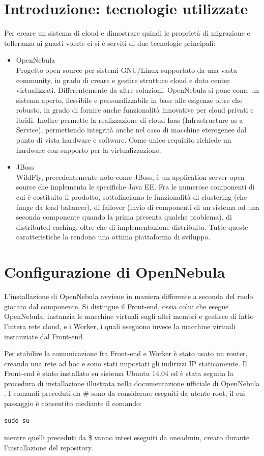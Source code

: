 \documentclass[twoside]{article}
\begin{document}
\section{Introduzione: tecnologie utilizzate}
Per creare un sistema di cloud e dimostrare quindi le proprietà di migrazione e
tolleranza ai guasti volute ci si è serviti di due tecnologie principali:
\begin{itemize}
	\item OpenNebula \\
		  Progetto open source per sistemi GNU/Linux supportato da una vasta community, in grado di
		  creare e gestire strutture cloud e data center virtualizzati. Differentemente da altre soluzioni,
		  OpenNebula si pone come un sistema aperto, flessibile e personalizzabile in base alle esigenze
		  oltre che robusto, in grado di fornire anche funzionalità innovative per cloud privati e ibridi.
		  Inoltre permette la realizzazione di cloud Iaas (Infrastructure as a Service), permettendo integrità
		  anche nel caso di macchine eterogenee dal punto di vista hardware e software. Come unico requisito
		  richiede un hardware con supporto per la virtualizzazione.
	\item JBoss \\
		  WildFly, precedentemente noto come JBoss, è un application server open source che implementa
		  le specifiche Java EE. Fra le numerose componenti di cui è costituito il prodotto, sottolineiamo
		  le funzionalità di clustering (che funge da load balancer), di failover (invio di componenti di
		  un sistema ad una seconda componente quando la prima presenta qualche problema), di distributed
		  caching, oltre che di implementazione distribuita. Tutte queste caratteristiche la rendono una
		  ottima piattaforma di sviluppo.
\end{itemize}

\section{Configurazione di OpenNebula}
L'installazione di OpenNebula avviene in maniera differente a seconda del ruolo giocato dal componente.
Si distingue il Front-end, ossia colui che esegue OpenNebula, instanzia le macchine virtuali sugli altri
membri e gestisce di fatto l'intera rete cloud, e i Worker, i quali eseguono invece la macchine virtuali
instanziate dal Front-end.

Per stabilire la comunicazione fra Front-end e Worker è stato usato un router, creando una rete ad hoc 
e sono stati impostati gli indirizzi IP staticamente.
Il Front-end è stato installato su sistema Ubuntu 14.04 ed è stata seguita
la procedura di installazione illustrata nella documentazione ufficiale di OpenNebula \cite{bib:opennebula}.
I comandi preceduti da \# sono da considerare eseguiti da utente root, il cui passaggio è consentito
mediante il comando:
\begin{lstlisting}[frame=trBL]
sudo su
\end{lstlisting}
mentre quelli preceduti da \$ vanno intesi eseguiti da oneadmin, creato durante l'installazione del
repository.
\end{document}
